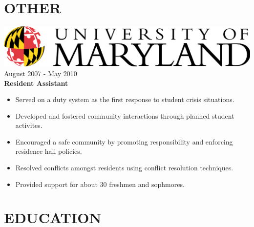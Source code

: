\documentclass[12pt, line, margin]{res}
\begin{document}
\begin{resume}
\section{OTHER} {\sl \includegraphics[scale=0.07]{resume_images/UMD_primary[Converted].png}} \hfill August 2007 - May 2010 \\
                \textbf{Resident Assistant}
                 \begin{itemize}  \itemsep -2pt %
                 \item   Served on a duty system as the first response to student crisis situations.
                 \item   Developed and fostered community interactions through planned student activites.
	       \item   Encouraged a safe community by promoting responsibility and enforcing residence hall policies.
	       \item   Resolved conflicts amongst residents using conflict resolution \newline
                               techniques.
	       \item   Provided support for about 30 freshmen and sophmores.
                \end{itemize}

\section{EDUCATION}


\end{resume}
\end{document}
